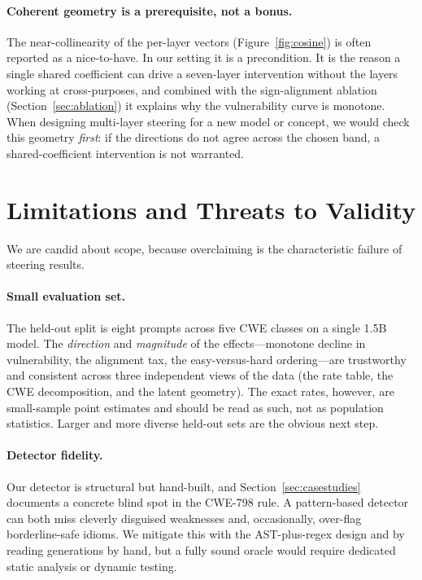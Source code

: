 \documentclass[11pt,a4paper]{article}
\begin{document}
\paragraph{Coherent geometry is a prerequisite, not a bonus.}
The near-collinearity of the per-layer vectors (Figure~\ref{fig:cosine}) is often reported as a nice-to-have. In our setting it is a precondition. It is the reason a single shared coefficient can drive a seven-layer intervention without the layers working at cross-purposes, and combined with the sign-alignment ablation (Section~\ref{sec:ablation}) it explains why the vulnerability curve is monotone. When designing multi-layer steering for a new model or concept, we would check this geometry \emph{first}: if the directions do not agree across the chosen band, a shared-coefficient intervention is not warranted.

\section{Limitations and Threats to Validity}
\label{sec:limitations}

We are candid about scope, because overclaiming is the characteristic failure of steering results.

\paragraph{Small evaluation set.}
The held-out split is eight prompts across five CWE classes on a single 1.5B model. The \emph{direction} and \emph{magnitude} of the effects---monotone decline in vulnerability, the alignment tax, the easy-versus-hard ordering---are trustworthy and consistent across three independent views of the data (the rate table, the CWE decomposition, and the latent geometry). The exact rates, however, are small-sample point estimates and should be read as such, not as population statistics. Larger and more diverse held-out sets are the obvious next step.

\paragraph{Detector fidelity.}
Our detector is structural but hand-built, and Section~\ref{sec:casestudies} documents a concrete blind spot in the CWE-798 rule. A pattern-based detector can both miss cleverly disguised weaknesses and, occasionally, over-flag borderline-safe idioms. We mitigate this with the AST-plus-regex design and by reading generations by hand, but a fully sound oracle would require dedicated static analysis or dynamic testing.
\end{document}
